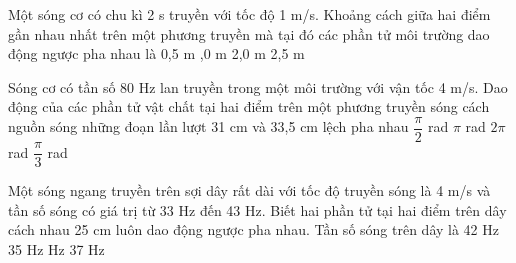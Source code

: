 \begin{vidu}%
Một sóng cơ có chu kì 2 s truyền với tốc độ 1 m/s. Khoảng cách giữa hai điểm gần nhau nhất trên một phương truyền mà tại đó các phần tử môi trường dao động ngược pha nhau là
\choice
{0,5 m}
{,0 m}
{2,0 m}
{2,5 m}
\end{vidu} %
\begin{vidu}%
Sóng cơ có tần số 80 Hz lan truyền trong một môi trường với vận tốc 4 m/s. Dao động của các phần tử vật chất tại hai điểm trên một phương truyền sóng cách nguồn sóng những đoạn lần lượt 31 cm và 33,5 cm lệch pha nhau
\choice
{$\dfrac{\pi}{2}$ rad}
{\True $\pi$ rad}
{$2\pi$ rad}
{$\dfrac{\pi}{3}$ rad}
\end{vidu} %
\begin{vidu}%
Một sóng ngang truyền trên sợi dây rất dài với tốc độ truyền sóng là 4 m/s và tần số sóng có giá trị từ 33 Hz đến 43 Hz. Biết hai phần tử tại hai điểm trên dây cách nhau 25 cm luôn dao động ngược pha nhau. Tần số sóng trên dây là
\choice
{42 Hz}
{35 Hz}
{ Hz}
{37 Hz}
\end{vidu} %


